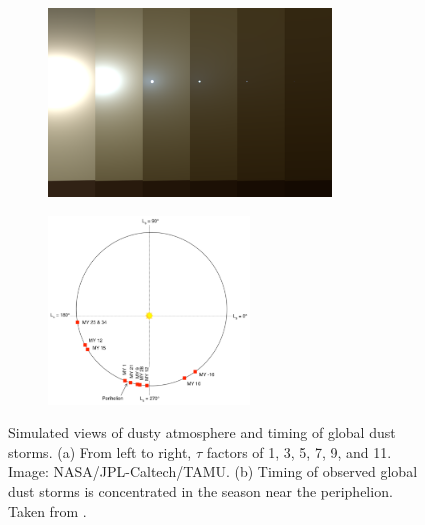 \begin{figure}[h]
\captionsetup[subfigure]{justification=centering}
\centering
    \hypersetup{hidelinks=true}%
    \begin{subfigure}[t]{0.55\textwidth}
        \centering
            \includegraphics[height=50mm]{sections/mars-solar-energy/solar-radiation/images/tau-factors.png}
            \label{fig:image:tau-factors}
    \end{subfigure}\hfill%
    \begin{subfigure}[t]{0.45\textwidth}
        \centering
            \includegraphics[height=50mm]{sections/mars-solar-energy/solar-radiation/images/timin-of-observed-global-dust-storms.png}
            \label{fig:image:global-dust-storm-timing}
    \end{subfigure}
    \caption[Simulated views of dusty atmosphere and timing of global dust storms]
    {Simulated views of dusty atmosphere and timing of global dust storms. (a) From left to right, $\tau$ factors of 1, 3, 5, 7, 9, and 11. Image: NASA/JPL-Caltech/TAMU. (b) Timing of observed global dust storms is concentrated in the season near the periphelion. Taken from .}
    \label{fig:dust}
\vspace{-2ex}
\end{figure}

